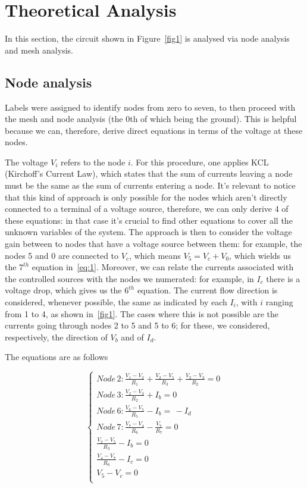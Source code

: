 \section{Theoretical Analysis}
\label{sec:analysis}

In this section, the circuit shown in Figure~\ref{fig1} is analysed via node analysis and mesh analysis.

\subsection{Node analysis}



Labels were assigned to identify nodes from zero to seven, to then proceed with the mesh and node analysis (the 0th of which being the ground). This is helpful because we can, therefore, derive direct equations in terms of the voltage at these nodes.

The voltage $V_i$ refers to the node $i$. For this procedure, one applies KCL (Kirchoff's Current Law), which states that the sum of currents leaving a node must be the same as the sum of currents entering a node. It's relevant to notice that this kind of approach is only possible for the nodes which aren't directly connected to a terminal of a voltage source, therefore, we can only derive 4 of these equations: in that case it's crucial to find other equations to cover all the unknown variables of the system. The approach is then to consider the voltage gain between to nodes that have a voltage source between them: for example, the nodes 5 and 0 are connected to $V_c$, which means $V_5 = V_c + V_0$, which wields us the $7^{th}$ equation in~\ref{eq:1}. Moreover, we can relate the currents associated with the controlled sources with the nodes we numerated: for example, in $I_c$ there is a voltage drop, which gives us the $6^{th}$ equation.
The current flow direction is considered, whenever possible, the same as indicated by each $I_i$, with $i$ ranging from 1 to 4, as shown in~\ref{fig1}. The cases where this is not possible are the currents going through nodes 2 to 5 and 5 to 6; for these, we considered, respectively, the direction of $V_b$ and of $I_d$.

The equations are as follows

\begin{equation} 
\begin{cases}  
    Node\, 2: \frac{V_1 - V_2}{R_1} + \frac{V_2 - V_5}{R_3} + \frac{V_2 - V_3}{R_2} = 0 \\
    Node\, 3: \frac{V_2 - V_3}{R_2} + I_b = 0 \\
    Node\, 6: \frac{V_6 - V_5}{R_5} - I_b = \,  - I_d \\
    Node\, 7: \frac{V_7 - V_4}{R_6} - \frac{V_7}{R_7} = 0 \\
    \frac{V_2 - V_5}{R_3} - I_b = 0 \\
    \frac{V_4 - V_7}{R_6} - I_c = 0\\
    V_5 - V_c = 0\\
\end{cases}
\label{eq:1}
\end{equation}

